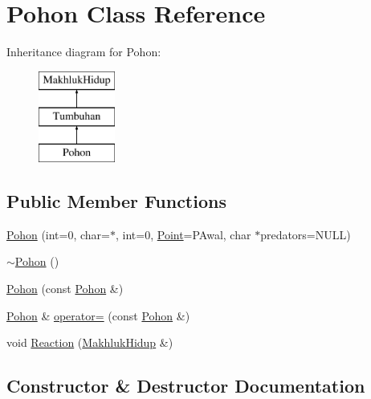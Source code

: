 \hypertarget{class_pohon}{}\section{Pohon Class Reference}
\label{class_pohon}
Inheritance diagram for Pohon\+:\begin{figure}[H]
\begin{center}
\leavevmode
\includegraphics[height=3.000000cm]{class_pohon}
\end{center}
\end{figure}
\subsection*{Public Member Functions}
\begin{DoxyCompactItemize}
\item 
\hyperlink{class_pohon_aabb89021fb96323ab8504f0292d0abb5}{Pohon} (int=0, char=\textquotesingle{}$\ast$\textquotesingle{}, int=0, \hyperlink{class_point}{Point}=P\+Awal, char $\ast$predators=N\+U\+LL)
\item 
\hyperlink{class_pohon_a4947ef4d078857340a2bdd384a17c4a7}{$\sim$\+Pohon} ()
\item 
\hyperlink{class_pohon_a7f0943d22d2b17a5545269c39dfa7a6a}{Pohon} (const \hyperlink{class_pohon}{Pohon} \&)
\item 
\hyperlink{class_pohon}{Pohon} \& \hyperlink{class_pohon_a31703236f73d7d043bdb78e060692ba2}{operator=} (const \hyperlink{class_pohon}{Pohon} \&)
\item 
void \hyperlink{class_pohon_a5c0b3b644fe9109e7ec219bbe04b24ff}{Reaction} (\hyperlink{class_makhluk_hidup}{Makhluk\+Hidup} \&)
\end{DoxyCompactItemize}


\subsection{Constructor \& Destructor Documentation}
